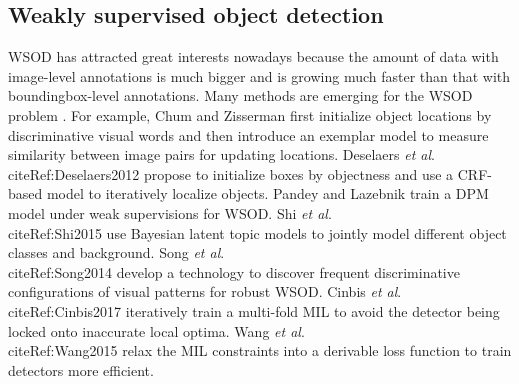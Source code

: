 \documentclass[10pt,journal,compsoc]{IEEEtran}
\def\etal{\emph{et al}.}
\begin{document}
\subsection{Weakly supervised object detection}
\label{sec:wsod}

WSOD has attracted great interests nowadays because the amount of data with image-level annotations is much bigger and is growing much faster than that with boundingbox-level annotations.
Many methods are emerging for the WSOD problem \cite{Ref:Chum2007,Ref:Deselaers2012,Ref:Pandey2011,Ref:Shi2015,Ref:Song2014learning,Ref:Song2014,Ref:Cinbis2017,Ref:Bilen2015,Ref:Wang2015,Ref:Wang2014}.
For example, Chum and Zisserman \cite{Ref:Chum2007} first initialize object locations by discriminative visual words and then introduce an exemplar model to measure similarity between image pairs for updating locations.
Deselaers \etal\\cite{Ref:Deselaers2012} propose to initialize boxes by objectness \cite{Ref:Alexe2012} and use a CRF-based model to iteratively localize objects.
Pandey and Lazebnik \cite{Ref:Pandey2011} train a DPM model \cite{Ref:Felzenszwalb2010} under weak supervisions for WSOD.
Shi \etal\\cite{Ref:Shi2015} use Bayesian latent topic models to jointly model different object classes and background.
Song \etal\\cite{Ref:Song2014} develop a technology to discover frequent discriminative configurations of visual patterns for robust WSOD.
Cinbis \etal\\cite{Ref:Cinbis2017} iteratively train a multi-fold MIL to avoid the detector being locked onto inaccurate local optima.
Wang \etal\\cite{Ref:Wang2015} relax the MIL constraints into a derivable loss function to train detectors more efficient.
\end{document}
